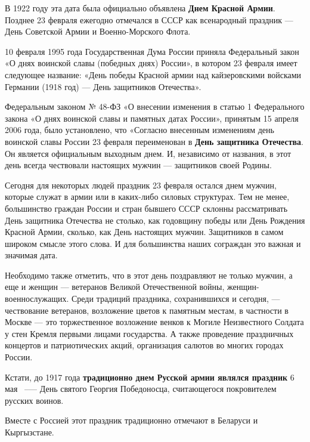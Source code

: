 \documentclass[12pt,A4, twoside]{article}
\begin{document}
\par В 1922 году эта дата была официально объявлена \textbf{Днем Красной Армии}. Позднее 23 февраля
ежегодно отмечался в СССР как всенародный праздник — День Советской Армии и Военно-Морского Флота.

\par 10 февраля 1995 года Государственная Дума России приняла Федеральный закон «О днях воинской славы
(победных днях) России», в котором 23 февраля имеет следующее название: «День победы Красной армии над
кайзеровскими войсками Германии (1918 год) — День защитников Отечества».

\par Федеральным законом № 48-ФЗ «О внесении изменения в статью 1 Федерального закона «О днях воинской
славы и памятных датах России», принятым 15 апреля 2006 года, было установлено, что «Согласно внесенным
изменениям день воинской славы России 23 февраля переименован в \textbf{День защитника Отечества}. Он
является официальным выходным днем. И, независимо от названия, в этот день всегда чествовали настоящих
мужчин — защитников своей Родины.

\par Сегодня для некоторых людей праздник 23 февраля остался днем мужчин, которые служат в армии или в
каких-либо силовых структурах. Тем не менее, большинство граждан России и стран бывшего СССР склонны
рассматривать День защитника Отечества не столько, как годовщину победы или День Рождения Красной Армии,
сколько, как День настоящих мужчин. Защитников в самом широком смысле этого слова. И для большинства
наших сограждан это важная и значимая дата.

\par Необходимо также отметить, что в этот день поздравляют не только мужчин, а еще и женщин — ветеранов
Великой Отечественной войны, женщин-военнослужащих. Среди традиций праздника, сохранившихся и сегодня, —
чествование ветеранов, возложение цветов к памятным местам, в частности в Москве — это торжественное
возложение венков к Могиле Неизвестного Солдата у стен Кремля первыми лицами государства. А также
проведение праздничных концертов и патриотических акций, организация салютов во многих городах России.

\par Кстати, до 1917 года \textbf{традиционно днем Русской армии являлся праздник} 6 мая ~--— День святого Георгия Победоносца, считающегося покровителем русских воинов.

\par Вместе с Россией этот праздник традиционно отмечают в Беларуси и Кыргызстане.
\end{document}
